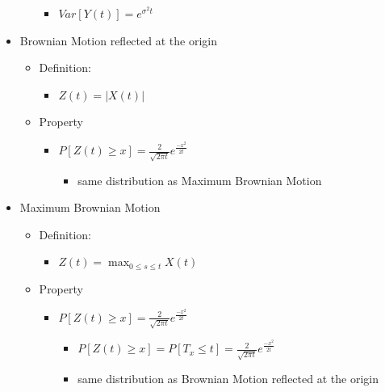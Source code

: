 \documentclass[a4paper]{article}
\begin{document}
\begin{itemize}
\begin{itemize}
\begin{itemize}
                    \item $\mathit{Var}[Y(t)] = e^{\sigma^2 t}$
                \end{itemize}
        \end{itemize}
    \item Brownian Motion reflected at the origin
        \begin{itemize}
            \item Definition:
                \begin{itemize}
                    \item $Z(t) = |X(t)|$
                \end{itemize}
            \item Property
                \begin{itemize}
                    \item $P[Z(t) \geq x] = \frac{2}{\sqrt{2 \pi t}} e^{\frac{-x^2}{2t}}$
                        \begin{itemize}
                            \item same distribution as Maximum Brownian Motion
                        \end{itemize}
                \end{itemize}
        \end{itemize}
    \item Maximum Brownian Motion
        \begin{itemize}
            \item Definition:
                \begin{itemize}
                    \item $Z(t) = \max_{0 \leq s \leq t} X(t)$
                \end{itemize}
            \item Property
                \begin{itemize}
                    \item $P[Z(t) \geq x] = \frac{2}{\sqrt{2 \pi t}} e^{\frac{-x^2}{2t}}$
                        \begin{itemize}
                            \item $P[Z(t) \geq x] = P[T_x \leq t] = \frac{2}{\sqrt{2 \pi t}} e^{\frac{-x^2}{2t}}$
                            \item same distribution as Brownian Motion reflected at the origin
                        \end{itemize}
                \end{itemize}

\end{itemize}
\end{itemize}
\end{document}
